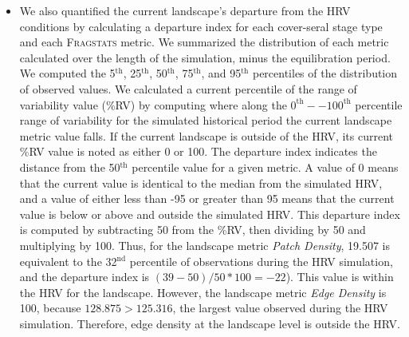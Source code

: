 \begin{itemize}
\item We also quantified the current landscape's departure from the HRV conditions by calculating a departure index for each cover-seral stage type and each \textsc{Fragstats} metric. We summarized the distribution of each metric calculated over the length of the simulation, minus the equilibration period. We computed the 5$^{\text{th}}$, 25$^{\text{th}}$, 50$^{\text{th}}$, 75$^{\text{th}}$, and 95$^{\text{th}}$ percentiles of the distribution of observed values. We calculated a current percentile of the range of variability value (\%RV) by computing where along the $0^{\text{th}}--100^{\text{th}}$ percentile range of variability for the simulated historical period the current landscape metric value falls. If the current landscape is outside of the HRV, its current \%RV value is noted as either 0 or 100. The departure index indicates the distance from the 50$^{\text{th}}$ percentile value for a given metric. A value of 0 means that the current value is identical to the median from the simulated HRV, and a value of either less than -95 or greater than 95 means that the current value is below or above and outside the simulated HRV. This departure index is computed by subtracting 50 from the \%RV, then dividing by 50 and multiplying by 100. Thus, for the landscape metric \emph{Patch Density}, 19.507 is equivalent to the 32$^{\text{nd}}$ percentile of observations during the HRV simulation, and the departure index is $(39-50)/50*100 = -22$). This value is within the HRV for the landscape. However, the landscape metric \emph{Edge Density} is 100, because $128.875 > 125.316$, the largest value observed during the HRV simulation. Therefore, edge density at the landscape level is outside the HRV.


\end{itemize}

